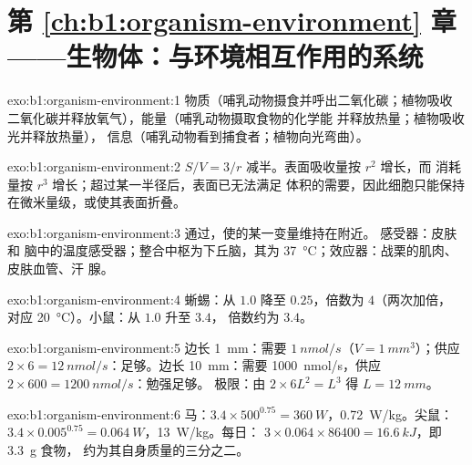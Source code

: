 \section*{第 \ref{ch:b1:organism-environment} 章——生物体：与环境相互作用的系统}

\begin{solution}{exo:b1:organism-environment:1}
物质（哺乳动物摄食并呼出二氧化碳；植物吸收
二氧化碳并释放氧气），能量（哺乳动物摄取食物的化学能
并释放热量；植物吸收光并释放热量），
信息（哺乳动物看到捕食者；植物向光弯曲）。
\end{solution}

\begin{solution}{exo:b1:organism-environment:2}
$S/V = 3/r$ 减半。表面吸收量按 $r^2$ 增长，而
消耗量按 $r^3$ 增长；超过某一半径后，表面已无法满足
体积的需要，因此细胞只能保持在微米量级，或使其表面折叠。
\end{solution}

\begin{solution}{exo:b1:organism-environment:3}
通过，使的某一变量维持在附近。
感受器：皮肤和
脑中的温度感受器；整合中枢为下丘脑，其为
\qty{37}{\celsius}；效应器：战栗的肌肉、皮肤血管、汗
腺。
\end{solution}

\begin{solution}{exo:b1:organism-environment:4}
蜥蜴：从 $1.0$ 降至 $0.25$，倍数为 $4$（两次加倍，
对应 \qty{20}{\celsius}）。小鼠：从 $1.0$ 升至 $3.4$，
倍数约为 $3.4$。
\end{solution}

\begin{solution}{exo:b1:organism-environment:5}
边长 \qty{1}{mm}：需要 $\qty{1}{nmol/s}$（$V = \qty{1}{mm^3}$）；供应
$2\times 6 = \qty{12}{nmol/s}$：足够。边长 \qty{10}{mm}：需要
\qty{1000}{nmol/s}，供应 $2\times 600 = \qty{1200}{nmol/s}$：勉强足够。
极限：由 $2\times 6L^2 = L^3$ 得 $L = \qty{12}{mm}$。
\end{solution}

\begin{solution}{exo:b1:organism-environment:6}
马：$3.4\times 500^{0.75} = \qty{360}{W}$，\qty{0.72}{W/kg}。尖鼠：
$3.4\times 0.005^{0.75} = \qty{0.064}{W}$，\qty{13}{W/kg}。每日：
$3\times 0.064\times 86400 = \qty{16.6}{kJ}$，即 \qty{3.3}{g} 食物，
约为其自身质量的三分之二。
\end{solution}

